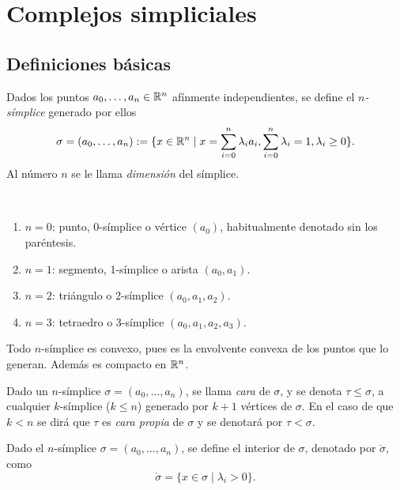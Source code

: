 \documentclass[HS.tex]{subfiles}
\begin{document}

\chapter{Complejos simpliciales}

\section{Definiciones básicas}

\begin{defi}
Dados los puntos $a_0,\dots, a_n\in\mathbb{R}^n$ afínmente independientes, se define el \emph{$n$-símplice} generado por ellos 
$$\sigma=(a_0,\dots, a_n):=\{x\in\mathbb{R}^n\mid x=\sum_{i=0}^n\lambda_ia_i, \sum_{i=0}^n\lambda_i=1,\lambda_i\geq 0\}.$$
Al número $n$ se le llama \emph{dimensión} del símplice.
\end{defi}

\begin{ej}\
\begin{enumerate}
\item $n=0$: punto, 0-símplice o vértice $(a_0)$, habitualmente denotado sin los paréntesis.
\item $n=1$: segmento, 1-símplice o arista $(a_0,a_1)$.
\item $n=2$: triángulo o 2-símplice   $(a_0,a_1,a_2)$.
\item $n=3$: tetraedro o 3-símplice $(a_0,a_1,a_2,a_3)$.
\end{enumerate}
\end{ej}

\begin{nota}
Todo $n$-símplice es convexo, pues es la envolvente convexa de los puntos que lo generan. Además es compacto en $\mathbb{R}^n$.
\end{nota}

\begin{defi}
Dado un $n$-símplice $\sigma=(a_0,\dots,a_n)$, se llama \emph{cara} de $\sigma$, y se denota $\tau\leq \sigma$, a cualquier $k$-símplice ($k\leq n$) generado por $k+1$ vértices de $\sigma$. En el caso de que $k<n$ se dirá que $\tau$ es \emph{cara propia} de $\sigma$ y se denotará por $\tau<\sigma$.
\end{defi}

\begin{defi}
Dado el $n$-símplice $\sigma=(a_0,\dots, a_n)$, se define el interior de $\sigma$, denotado por $\mathring{\sigma}$, como
$$\mathring{\sigma}=\{x\in\sigma\mid \lambda_i>0\}.$$
\end{defi}
\end{document}
